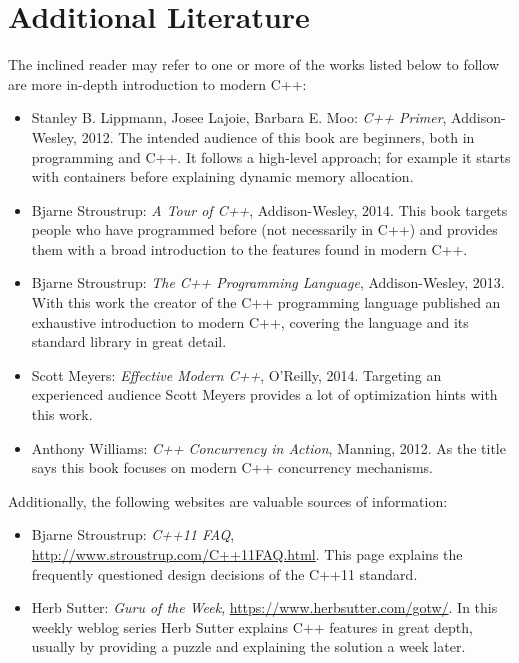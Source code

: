 \section{Additional Literature}

The inclined reader may refer to one or more of the works listed below to follow are more in-depth introduction to modern C++:

\begin{itemize}
\item Stanley B. Lippmann, Josee Lajoie, Barbara E. Moo: \textit{C++ Primer}, Addison-Wesley, 2012. The intended audience of this book are beginners, both in programming and C++. It follows a high-level approach; for example it starts with containers before explaining dynamic memory allocation.
\item Bjarne Stroustrup: \textit{A Tour of C++}, Addison-Wesley, 2014. This book targets people who have programmed before (not necessarily in C++) and provides them with a broad introduction to the features found in modern C++.
\item Bjarne Stroustrup: \textit{The C++ Programming Language}, Addison-Wesley, 2013. With this work the creator of the C++ programming language published an exhaustive introduction to modern C++, covering the language and its standard library in great detail.
\item Scott Meyers: \textit{Effective Modern C++}, O'Reilly, 2014. Targeting an experienced audience Scott Meyers provides a lot of optimization hints with this work.
\item Anthony Williams: \textit{C++ Concurrency in Action}, Manning, 2012. As the title says this book focuses on modern C++ concurrency mechanisms.
\end{itemize}

Additionally, the following websites are valuable sources of information:

\begin{itemize}
\item Bjarne Stroustrup: \textit{C++11 FAQ}, \url{http://www.stroustrup.com/C++11FAQ.html}. This page explains the frequently questioned design decisions of the C++11 standard.
\item Herb Sutter: \textit{Guru of the Week}, \url{https://www.herbsutter.com/gotw/}. In this weekly weblog series Herb Sutter explains C++ features in great depth, usually by providing a puzzle and explaining the solution a week later.
\end{itemize}